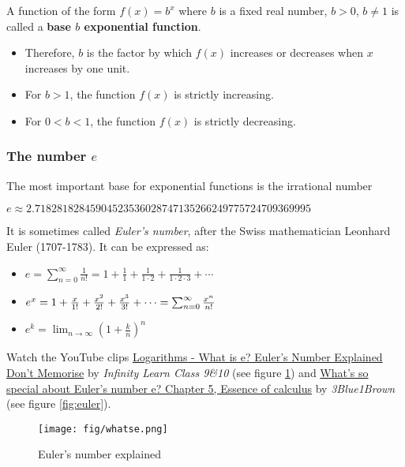 A function of the form \(f(x) = b^{x}\) where \(b\) is a fixed real number, \(b > 0\), \(b \neq 1\) is called a \textbf{base \(b\) exponential function}.

\begin{itemize}
\item
Therefore, \(b\) is the factor by which \(f(x)\) increases or decreases when \(x\) increases by one unit.
\item
For \(b > 1\), the function \(f(x)\) is strictly increasing.
\item
For \(0 < b < 1\), the function \(f(x)\) is strictly decreasing.
\end{itemize}

\subsubsection{\texorpdfstring{The number \(e\)}{The number e}}\label{the-number-e}

The most important base for exponential functions is the irrational number

\(e \approx 2.71828182845904523536028747135266249775724709369995\)

It is sometimes called \emph{Euler's number}, after the Swiss mathematician Leonhard Euler (1707-1783).
It can be expressed as:

\begin{itemize}
\item
\(e = \sum \limits _{n=0}^{\infty }{\frac {1}{n!}} = 1+{\frac {1}{1}}+{\frac {1}{1\cdot 2}}+{\frac {1}{1\cdot 2\cdot 3}}+\cdots\)
\item
\(e^{x} = 1+{x \over 1!}+{x^{2} \over 2!}+{x^{3} \over 3!}+\cdots = \sum _{n=0}^{\infty }{\frac {x^{n}}{n!}}\)
\item
\(e^k = \lim _{n\to \infty }\left(1+{\frac {k}{n}}\right)^{n}\)
\end{itemize}

Watch the YouTube clips \href{https://youtu.be/_-x90wGBD8U}{Logarithms - What is e? \textbar{} Euler's Number Explained \textbar{} Don't Memorise} by \emph{Infinity Learn Class 9\&10} (see figure \ref{fig:whatse}) and \href{https://youtu.be/m2MIpDrF7Es}{What's so special about Euler's number e? \textbar{} Chapter 5, Essence of calculus} by \emph{3Blue1Brown} (see figure \ref{fig:euler}).

\begin{figure}
\centering
\texttt{[image: fig/whatse.png]}
\caption{\label{fig:whatse} Euler's number explained}
\end{figure}

